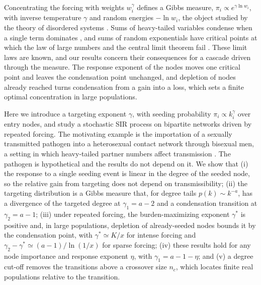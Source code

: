 \documentclass[pre,twocolumn,superscriptaddress,amsmath,amssymb,floatfix]{revtex4-2}
\begin{document}
Concentrating the forcing with weights $w_i^\gamma$ defines a Gibbs measure,
$\pi_i\propto e^{\gamma\ln w_i}$, with inverse temperature $\gamma$ and random energies $-\ln w_i$, the
object studied by the theory of disordered systems
\cite{derrida1981random,mezard1987spin,mezard2009information}. Sums of
heavy-tailed variables condense when a single term dominates
\cite{derrida1987statistical,bouchaud1997universality,derrida1997random,majumdar2005nature,vezzani2019single},
and sums of random exponentials have critical points at which the law of large
numbers and the central limit theorem fail \cite{benarous2005limit}. These
limit laws are known, and our results concern their consequences
for a cascade driven through the measure. The response exponent of the nodes
moves one critical point and leaves the condensation point unchanged, and
depletion of nodes already reached turns condensation from a gain into a loss,
which sets a finite optimal concentration in large populations.

Here we introduce a targeting exponent $\gamma$, with seeding probability
$\pi_i\propto k_i^\gamma$ over entry nodes, and study a stochastic SIR process on bipartite
networks driven by repeated forcing. The motivating example is the importation
of a sexually transmitted pathogen into a heterosexual contact network through
bisexual men, a setting in which heavy-tailed partner numbers affect
transmission \cite{endo2022heavy}. The pathogen is hypothetical and the results
do not depend on it. We show that (i) the response to a single seeding event is
linear in the degree of the seeded node, so the relative gain from targeting
does not depend on transmissibility; (ii) the targeting distribution is a Gibbs
measure that, for degree tails $p(k)\sim k^{-a}$, has a divergence of the targeted
degree at $\gamma_1=a-2$ and a condensation transition at $\gamma_2=a-1$; (iii) under
repeated forcing, the burden-maximizing exponent $\gamma^*$ is positive and, in large
populations, depletion of already-seeded nodes bounds it by the condensation
point, with $\gamma^*\simeq K/x$ for intense forcing and
$\gamma_2-\gamma^*\simeq(a-1)/\ln(1/x)$ for sparse forcing; (iv) these results hold for any node
importance and response exponent $\eta$, with $\gamma_1=a-1-\eta$; and (v) a degree cut-off
removes the transitions above a crossover size $n_c$, which locates finite real
populations relative to the transition.

\end{document}
